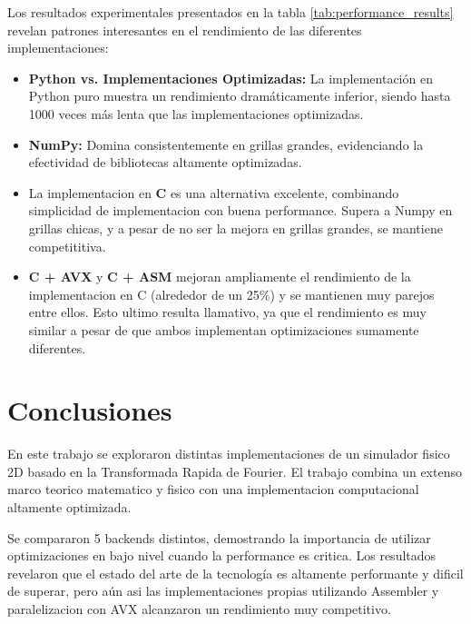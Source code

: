 \documentclass[a4paper]{article}
\begin{document}
Los resultados experimentales presentados en la tabla \ref{tab:performance_results} revelan patrones interesantes en el rendimiento de las diferentes implementaciones:
\begin{itemize}
    \item \textbf{Python vs. Implementaciones Optimizadas:} La implementación en Python puro muestra un rendimiento dramáticamente inferior, siendo hasta 1000 veces más lenta que las implementaciones optimizadas.

    \item \textbf{NumPy:} Domina consistentemente en grillas grandes, evidenciando la efectividad de bibliotecas altamente optimizadas.

    \item La implementacion en \textbf{C} es una alternativa excelente, combinando simplicidad de implementacion con buena performance. Supera a Numpy en grillas chicas, y a pesar de no ser la mejora en grillas grandes, se mantiene competititiva.

    \item \textbf{C + AVX} y \textbf{C + ASM} mejoran ampliamente el rendimiento de la implementacion en C (alrededor de un 25\%) y se mantienen muy parejos entre ellos. Esto ultimo resulta llamativo, ya que el rendimiento es muy similar a pesar de que ambos implementan optimizaciones sumamente diferentes.
\end{itemize}

\section{Conclusiones}
En este trabajo se exploraron distintas implementaciones de un simulador fisico 2D basado en la Transformada Rapida de Fourier. El trabajo combina un extenso marco teorico matematico y fisico con una implementacion computacional altamente optimizada.

Se compararon 5 backends distintos, demostrando la importancia de utilizar optimizaciones en bajo nivel cuando la performance es critica. Los resultados revelaron que el estado del arte de la tecnología es altamente performante y dificil de superar, pero aún asi las implementaciones propias utilizando Assembler y paralelizacion con AVX alcanzaron un rendimiento muy competitivo.
\printbibliography
\end{document}
